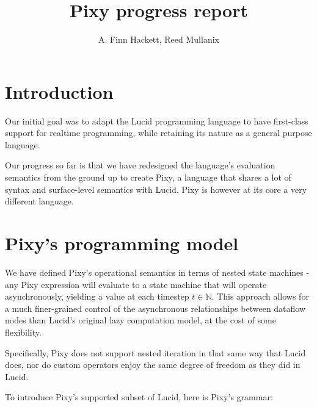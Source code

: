 \documentclass{scrartcl}
\begin{document}
    \title{Pixy progress report}
    \author{A. Finn Hackett, Reed Mullanix}
    
    \maketitle
    
    \tableofcontents
    
    \section{Introduction}
    
    Our initial goal was to adapt the Lucid programming language to have first-class support for realtime programming, while retaining its nature as a general purpose language.
    
    Our progress so far is that we have redesigned the language's evaluation semantics from the ground up to create Pixy, a language that shares a lot of syntax and surface-level semantics with Lucid. Pixy is however at its core a very different language.
    
    \section{Pixy's programming model}
    
    We have defined Pixy's operational semantics in terms of nested state machines - any Pixy expression will evaluate to a state machine that will operate asynchronously, yielding a value at each timestep $t \in \mathbb{N}$.
    This approach allows for a much finer-grained control of the asynchronous relationships between dataflow nodes than Lucid's original lazy computation model, at the cost of some flexibility.
    
    Specifically, Pixy does not support nested iteration in that same way that Lucid does, nor do custom operators enjoy the same degree of freedom as they did in Lucid.
    
    To introduce Pixy's supported subset of Lucid, here is Pixy's grammar:
    
\end{document}
